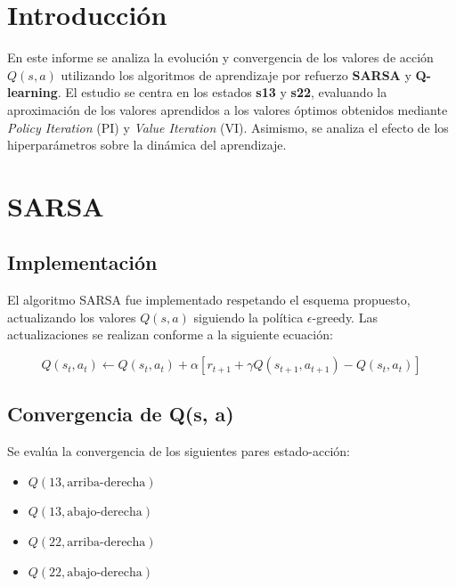\documentclass[a4paper,12pt]{article}
\newcommand{\vacio}{\textcolor{white}{ .}}
\begin{document}
\renewcommand{\footrulewidth}{0.5pt}
\fancyfoot[C]{\vacio}


\renewcommand{\contentsname}{Índice}
\tableofcontents
{}

\newpage


\section{Introducción}
En este informe se analiza la evolución y convergencia de los valores de acción \( Q(s, a) \) utilizando los algoritmos de aprendizaje por refuerzo \textbf{SARSA} y \textbf{Q-learning}. 
El estudio se centra en los estados \textbf{s13} y \textbf{s22}, evaluando la aproximación de los valores aprendidos a los valores óptimos obtenidos mediante \textit{Policy Iteration} (PI) y \textit{Value Iteration} (VI). 
Asimismo, se analiza el efecto de los hiperparámetros sobre la dinámica del aprendizaje.

\section{SARSA}

\subsection{Implementación}
El algoritmo SARSA fue implementado respetando el esquema propuesto, actualizando los valores \( Q(s, a) \) siguiendo la política \(\epsilon\)-greedy. Las actualizaciones se realizan conforme a la siguiente ecuación:

\[
Q(s_t, a_t) \leftarrow Q(s_t, a_t) + \alpha \left[ r_{t+1} + \gamma Q(s_{t+1}, a_{t+1}) - Q(s_t, a_t) \right]
\]

\subsection{Convergencia de  Q(s, a)}

Se evalúa la convergencia de los siguientes pares estado-acción:

\begin{itemize}
    \item \( Q(13, \text{arriba-derecha}) \)
    \item \( Q(13, \text{abajo-derecha}) \)
    \item \( Q(22, \text{arriba-derecha}) \)
    \item \( Q(22, \text{abajo-derecha}) \)
\end{itemize}
\end{document}
